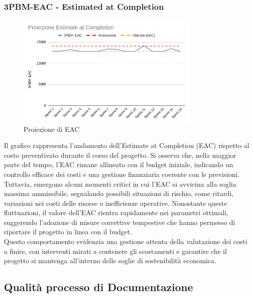 \documentclass{article}
\begin{document}
        \subsubsection{3PBM-EAC - Estimated at Completion}
        \begin{figure}[H]
            \centering
            \includegraphics[width=0.8\textwidth]{../../../img/pdq_charts/chart4-proiezioneEAC.png}
            \caption{Proiezione di EAC}
        \end{figure}
        Il grafico rappresenta l'andamento dell'Estimate at Completion (EAC) rispetto al costo preventivato durante il corso del progetto. Si osserva che, nella maggior parte del tempo, l'EAC rimane allineato con il budget iniziale, indicando un controllo efficace dei costi e una gestione finanziaria coerente con le previsioni.\\
        Tuttavia, emergono alcuni momenti critici in cui l'EAC si avvicina alla soglia massima ammissibile, segnalando possibili situazioni di rischio, come ritardi, variazioni nei costi delle risorse o inefficienze operative. Nonostante queste fluttuazioni, il valore dell'EAC rientra rapidamente nei parametri ottimali, suggerendo l'adozione di misure correttive tempestive che hanno permesso di riportare il progetto in linea con il budget.\\
        Questo comportamento evidenzia una gestione attenta della valutazione dei costi a finire, con interventi mirati a contenere gli scostamenti e garantire che il progetto si mantenga all'interno delle soglie di sostenibilità economica.


    \subsection{Qualità processo di Documentazione}
\end{document}
